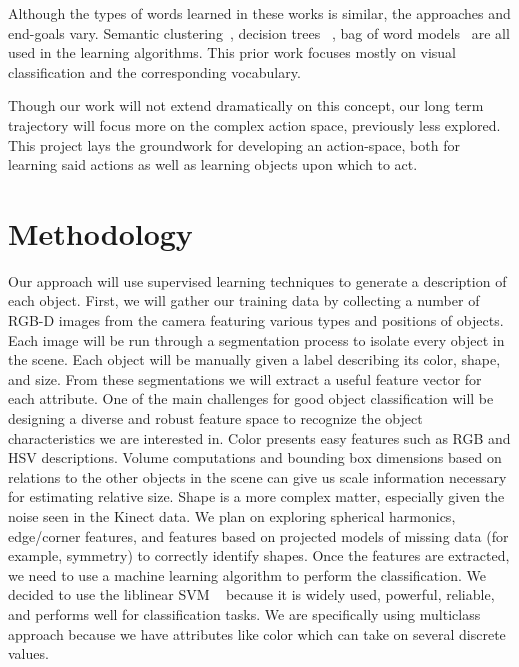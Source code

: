 \documentclass[11pt]{article}
\newcommand{\xxx}[1]{{\bf \color{red} #1}}
\begin{document}
Although the types of words learned in these works is similar, the approaches and
end-goals vary. Semantic clustering~\cite{zambuto2010visually}, decision trees
~\cite{gold2009robotic}, bag of word models~\cite{roy2002learning} are all used
in the learning algorithms. This prior work focuses mostly on visual
classification and the corresponding vocabulary.

Though our work will not extend dramatically on this concept, our long term
trajectory will focus more on the complex action space, previously less explored.
This project lays the groundwork for developing an action-space, both for
learning said actions as well as learning objects upon which to act.

\section{Methodology}

Our approach will use supervised learning techniques to generate a description
of each object. First, we will gather our training data by collecting a number
of RGB-D images from the camera featuring various types and positions of objects.
Each image will be run through a segmentation process to isolate every object in
the scene. Each object will be manually given a label describing its color,
shape, and size. From these segmentations we will extract a useful feature vector
for each attribute. One of the main challenges for good object classification
will be designing a diverse and robust feature space to recognize the object
characteristics we are interested in. Color presents easy features such as RGB
and HSV descriptions. Volume computations and bounding box dimensions based on
relations to the other objects in the scene can give us scale information
necessary for estimating relative size. Shape is a more complex matter,
especially given the noise seen in the Kinect data. We plan on exploring
spherical harmonics, edge/corner features, and features based on projected
models of missing data (for example, symmetry) to correctly identify shapes.
Once the features are extracted, we need to use a machine learning algorithm to
perform the classification. We decided to use the liblinear SVM ~\cite{LIBLINEAR}
because it is widely used, powerful, reliable, and performs well for
classification tasks. We are specifically using multiclass approach because we
have attributes like color which can take on several discrete values.
\end{document}
